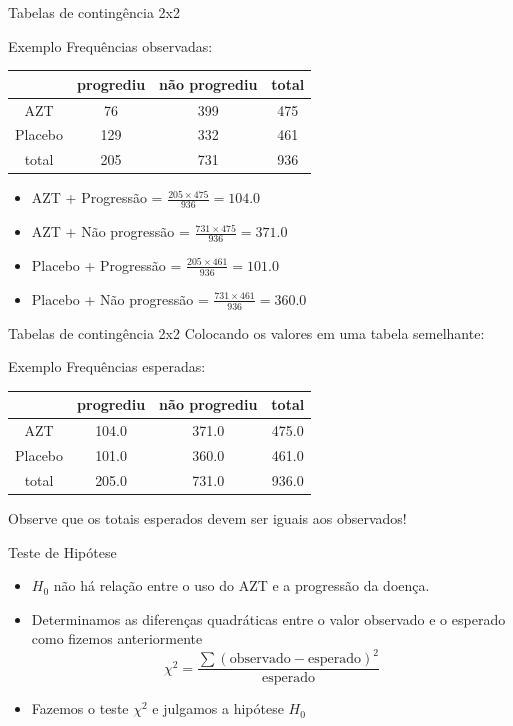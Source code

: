 \documentclass{beamer}
\begin{document}
\begin{frame}{Tabelas de contingência 2x2}
  \begin{exampleblock}{Exemplo}
    Frequências observadas:
    \begin{tabular}{c|c|c|c}
      & progrediu & não progrediu & total\\
      \hline
      AZT & 76 & 399 & 475\\
      \hline
      Placebo & 129 & 332 & 461\\
      \hline
      total & 205 & 731 & 936\\
    \end{tabular}
  \end{exampleblock}
  \begin{itemize}
  \item AZT + Progressão = $\frac{205 \times 475}{936} = 104.0$
  \item AZT + Não progressão = $\frac{731 \times 475}{936} = 371.0$
  \item Placebo + Progressão = $\frac{205 \times 461}{936} = 101.0$
  \item Placebo + Não progressão = $\frac{731 \times 461}{936} = 360.0$
  \end{itemize}
\end{frame}

\begin{frame}{Tabelas de contingência 2x2}
Colocando os valores em uma tabela semelhante:
  \begin{exampleblock}{Exemplo}
    Frequências esperadas:
    \begin{tabular}{c|c|c|c}
      & progrediu & não progrediu & total\\
      \hline
      AZT & 104.0 & 371.0 & 475.0\\
      \hline
      Placebo & 101.0 & 360.0 & 461.0\\
      \hline
      total & 205.0 & 731.0 & 936.0\\
    \end{tabular}
  \end{exampleblock}
Observe que os totais esperados devem ser iguais aos observados!
\end{frame}

\begin{frame}{Teste de Hipótese}
  \begin{itemize}
  \item $H_0$ não há relação entre o uso do AZT e a progressão da doença.
  \item Determinamos as diferenças quadráticas entre o valor observado
    e o esperado como fizemos anteriormente
    \begin{displaymath}
      \chi^2 = \frac{\sum (\text{observado} - \text{esperado})^2 }{\text{esperado}}
    \end{displaymath}
  \item Fazemos o teste $\chi^2$ e julgamos a hipótese $H_0$
  \end{itemize}
\end{frame}
\end{document}
